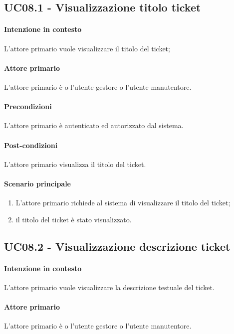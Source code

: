 \subsection{UC08.1 - Visualizzazione titolo ticket}\label{uc:08.1}

\paragraph{Intenzione in contesto} L'attore primario vuole visualizzare il titolo del ticket;
\paragraph{Attore primario} L'attore primario è o l'utente gestore o l'utente manutentore.
\paragraph{Precondizioni} L'attore primario è autenticato ed autorizzato dal sistema.
\paragraph{Post-condizioni} L'attore primario visualizza il titolo del ticket.
\paragraph{Scenario principale}
\begin{enumerate}
    \item L'attore primario richiede al sistema di visualizzare il titolo del ticket;
    \item il titolo del ticket è stato visualizzato.
\end{enumerate}

\subsection{UC08.2 - Visualizzazione descrizione ticket}\label{uc:08.2}

\paragraph{Intenzione in contesto} L'attore primario vuole visualizzare la descrizione testuale del ticket.
\paragraph{Attore primario} L'attore primario è o l'utente gestore o l'utente manutentore.
